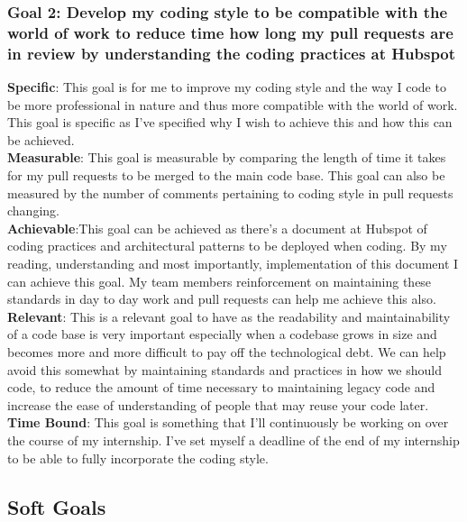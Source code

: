 \documentclass[11pt]{article} %
\begin{document}
\subsubsection{Goal 2: Develop my coding style to be compatible with the world of work to reduce time how long my pull requests are in review by understanding the coding practices at Hubspot}
\textbf{Specific}: This goal is for me to improve my coding style and the way I code to be more professional in nature and thus more compatible with the world of work. This goal is specific as I've specified why I wish to achieve this and how this can be achieved. 
\\ \textbf{Measurable}: This goal is measurable by comparing the length of time it takes for my pull requests to be merged to the main code base.  This goal can also be measured by the number of comments pertaining to coding style in pull requests changing.
\\ \textbf{Achievable}:This goal can be achieved as there's a document at Hubspot of coding practices and architectural patterns to be deployed when coding.  By my reading,  understanding and most importantly,  implementation of this document I can achieve this goal.  My team members reinforcement on maintaining these standards in day to day work and pull requests can help me achieve this also.
\\ \textbf{Relevant}: This is a relevant goal to have as the readability and maintainability of a code base is very important especially when a codebase grows in size and becomes more and more difficult to pay off the technological debt.  We can help avoid this somewhat by maintaining standards and practices in how we should code,  to reduce the amount of time necessary to maintaining legacy code and increase the ease of understanding of people that may reuse your code later.
\\ \textbf{Time Bound}: This goal is something that I'll continuously be working on over the course of my internship.  I've set myself a deadline of the end of my internship to be able to fully incorporate the coding style.
\subsection{Soft Goals}
\end{document}
